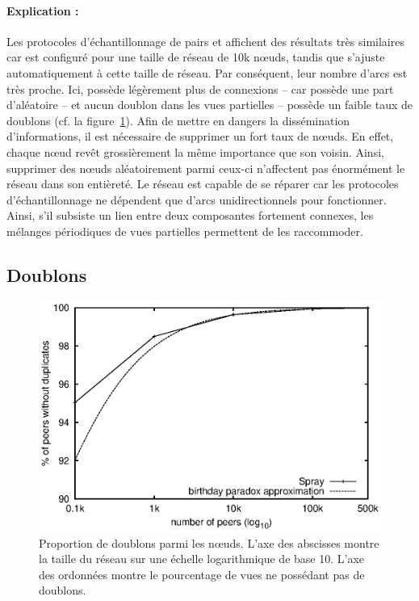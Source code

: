 \paragraph{Explication :} Les protocoles d'échantillonnage de pairs \CYCLON et
\SPRAY affichent des résultats très similaires car \CYCLON est configuré pour
une taille de réseau de 10k nœuds, tandis que \SPRAY s'ajuste automatiquement à
cette taille de réseau. Par conséquent, leur nombre d'arcs est très proche. Ici,
\CYCLON possède légèrement plus de connexions -- car \SPRAY possède une part
d'aléatoire -- et aucun doublon dans les vues partielles -- \SPRAY possède un
faible taux de doublons (cf. la figure~\ref{net:fig:duplicates}). Afin de mettre
en dangers la dissémination d'informations, il est nécessaire de supprimer un
fort taux de nœuds. En effet, chaque nœud revêt grossièrement la même importance
que son voisin. Ainsi, supprimer des nœuds aléatoirement parmi ceux-ci
n'affectent pas énormément le réseau dans son entièreté. Le réseau est capable
de se réparer car les protocoles d'échantillonnage ne dépendent que d'arcs
unidirectionnels pour fonctionner. Ainsi, s'il subsiste un lien entre deux
composantes fortement connexes, les mélanges périodiques de vues partielles
permettent de les raccommoder.


\subsection{Doublons}
\label{net:subsec:duplicates}

\begin{figure}
  \centering
  \includegraphics[width=.8\textwidth]{img/spray/duplicates.eps}
  \caption[Proportion de redondance dans \SPRAY]{\label{net:fig:duplicates}
    Proportion de doublons parmi les nœuds.  L'axe des abscisses montre la
    taille du réseau sur une échelle logarithmique de base 10. L'axe des
    ordonnées montre le pourcentage de vues ne possédant pas de doublons.}
\end{figure}

